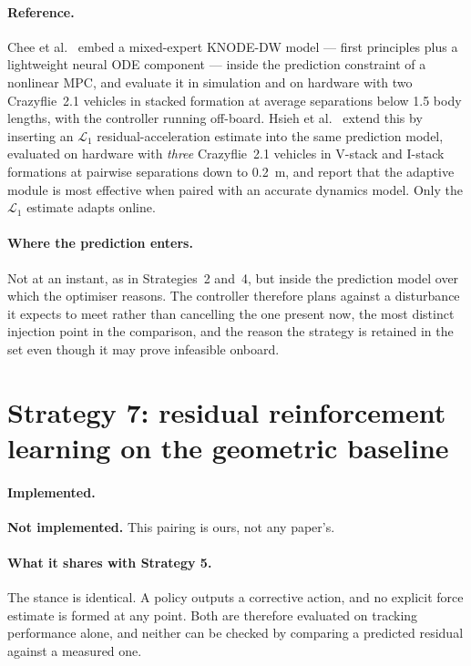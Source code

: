 \paragraph{Reference.} Chee et al.~\cite{chee2024knodedwmpc} embed a mixed-expert KNODE-DW model
--- first principles plus a lightweight neural ODE component --- inside the prediction constraint
of a nonlinear MPC, and evaluate it in simulation and on hardware with two Crazyflie~2.1 vehicles
in stacked formation at average separations below \num{1.5} body lengths, with the controller
running off-board. Hsieh et
al.~\cite{hsieh2025onlineadaptation} extend this by inserting an $\mathcal{L}_1$
residual-acceleration estimate into the same prediction model, evaluated on hardware with
\emph{three} Crazyflie~2.1 vehicles in V-stack and I-stack formations at pairwise separations down
to \SI{0.2}{\metre}, and report that the adaptive module is most effective when paired with an
accurate dynamics model. Only the $\mathcal{L}_1$ estimate adapts online.

\paragraph{Where the prediction enters.} Not at an instant, as in Strategies~2 and~4, but inside
the prediction model over which the optimiser reasons. The controller therefore plans against a
disturbance it expects to meet rather than cancelling the one present now, the most distinct
injection point in the comparison, and the reason the strategy is retained in the set even though
it may prove infeasible onboard.

\section{Strategy 7: residual reinforcement learning on the geometric baseline}
\label{sec:ctrl-s7}

\paragraph{Implemented.} \textbf{Not implemented.} This pairing is ours, not any paper's.

\paragraph{What it shares with Strategy 5.} The stance is identical. A policy outputs a corrective
action, and no explicit force estimate is formed at any point. Both are therefore evaluated on
tracking performance alone, and neither can be checked by comparing a predicted residual against a
measured one.

